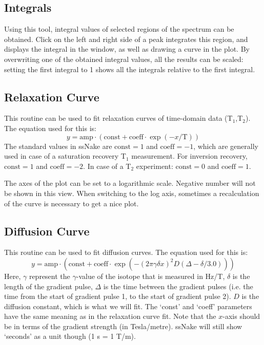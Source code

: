 \documentclass[11pt,a4paper]{article}
\begin{document}
\subsection{Integrals}
Using this tool, integral values of selected regions of the spectrum can be obtained. Click on the
left and right side of a peak integrates this region, and displays the integral in the window, as
well as drawing a curve in the plot. By overwriting one of the obtained integral values, all the
results can be scaled: setting the first integral to 1 shows all the integrals relative to the first
integral.

\subsection{Relaxation Curve}
This routine can be used to fit relaxation curves of time-domain data (T$_1$,T$_2$). The equation
used for this is:
\begin{equation}
  y = \text{amp} \cdot (\text{const} + \text{coeff} \cdot \exp(-x/\text{T}))
\end{equation}
The standard values in ssNake are $\text{const} = 1$ and $\text{coeff} = -1$, which are generally
used in case of a saturation recovery T$_1$ measurement. For inversion recovery,  $\text{const} = 1$
and $\text{coeff} = -2$. In case of a T$_2$ experiment:  $\text{const} = 0$
and $\text{coeff} = 1$.

The axes of the plot can be set to a logarithmic scale. Negative number will not be shown in this
view. When switching to the log axis, sometimes a recalculation of the curve is necessary to get a
nice plot.


\subsection{Diffusion Curve}
This routine can be used to fit diffusion curves. The equation
used for this is:
\begin{equation}
   y = \text{amp} \cdot (\text{const} + \text{coeff} \cdot \exp(-(2\pi\gamma  \delta  x)^2  D  (\Delta -\delta / 3.0)))
\end{equation}
Here, $\gamma$ represent the $\gamma$-value of the isotope that is measured in Hz/T, $\delta$ is the length
of the gradient pulse, $\Delta$ is the time between the gradient pulses (i.e. the time from the
start of gradient pulse 1, to the start of gradient pulse 2). $D$ is the diffusion constant, which
is what we will fit. The `const' and `coeff' parameters have the same meaning as in the relaxation
curve fit. Note that the $x$-axis should be in terms of the gradient strength (in Tesla/metre). ssNake
will still show `seconds' as a unit though (1 s = 1 T/m).
\end{document}
